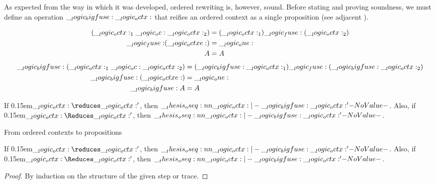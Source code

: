 As expected from the way in which it was developed, ordered rewriting is, however, sound.
Before stating and proving soundness, we must define an operation $\__logic_bigfuse: \__logic_octx:$ that reifies an ordered context as a single proposition (see adjacent ).
%
\begin{marginfigure}
  \begin{align*}
    (\__logic_octx:_1 \__logic_oc: \__logic_octx:_2) &= (\__logic_octx:_1) \__logic_fuse: (\__logic_octx:_2) \\
    \mathord{\text{$\__logic_fuse:$}} (\__logic_octxe:) &= \__logic_one: \\
    A &= A
  \end{align*}
  \begin{align*}
    \__logic_bigfuse: (\__logic_octx:_1 \__logic_oc: \__logic_octx:_2) &= (\__logic_bigfuse: \__logic_octx:_1) \__logic_fuse: (\__logic_bigfuse: \__logic_octx:_2) \\
    \__logic_bigfuse: (\__logic_octxe:) &= \__logic_one: \\
    \__logic_bigfuse: A &= A
  \end{align*}
\begin{theorem}
  If \kern0.15em$\octx \reduces \octx'$, then\/ $\oseq{\octx |- \bigfuse \octx'}$.
  Also, if \kern0.15em$\octx \Reduces \octx'$, then\/ $\oseq{\octx |- \bigfuse \octx'}$.
\end{theorem}
  \caption{From ordered contexts to propositions}\label{fig:ordered-rewriting:bigfuse}
\end{marginfigure}
%
\begin{theorem}[Soundness]
  If \kern0.15em$\octx \reduces \octx'$, then\/ $\oseq{\octx |- \bigfuse \octx'}$.
  Also, if \kern0.15em$\octx \Reduces \octx'$, then\/ $\oseq{\octx |- \bigfuse \octx'}$.
\end{theorem}
%
\begin{proof}
  By induction on the structure of the given step or trace.
\end{proof}

